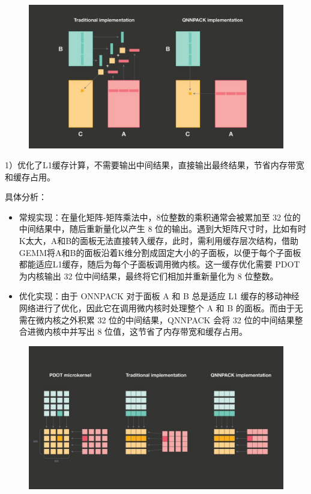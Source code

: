 \begin{figure}
\centering
\includegraphics{./img/ch17/QNNPACK1.jpeg}
\caption{}
\end{figure}

​
1）优化了L1缓存计算，不需要输出中间结果，直接输出最终结果，节省内存带宽和缓存占用。

具体分析：

\begin{itemize}
\item
  常规实现：在量化矩阵-矩阵乘法中，8位整数的乘积通常会被累加至 32
  位的中间结果中，随后重新量化以产生 8
  位的输出。遇到大矩阵尺寸时，比如有时K太大，A和B的面板无法直接转入缓存，此时，需利用缓存层次结构，借助GEMM将A和B的面板沿着K维分割成固定大小的子面板，以便于每个子面板都能适应L1缓存，随后为每个子面板调用微内核。这一缓存优化需要
  PDOT 为内核输出 32 位中间结果，最终将它们相加并重新量化为 8 位整数。
\item
  优化实现：由于 ONNPACK 对于面板 A 和 B 总是适应 L1
  缓存的移动神经网络进行了优化，因此它在调用微内核时处理整个 A 和 B
  的面板。而由于无需在微内核之外积累 32 位的中间结果，QNNPACK 会将 32
  位的中间结果整合进微内核中并写出 8 位值，这节省了内存带宽和缓存占用。
\end{itemize}

\begin{figure}
\centering
\includegraphics{./img/ch17/QNNPACK2.jpeg}
\caption{}
\end{figure}


